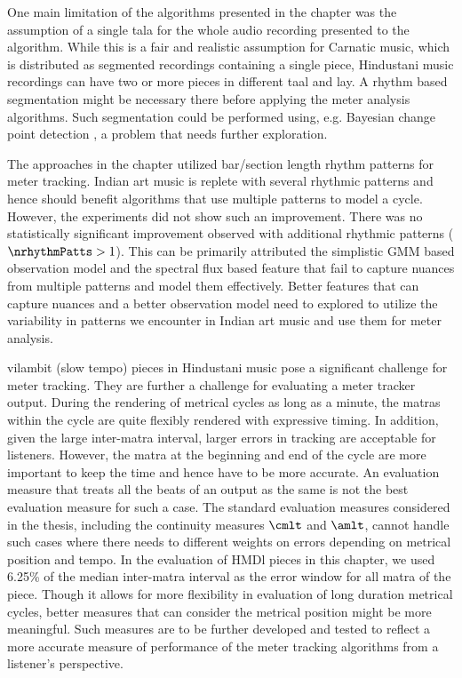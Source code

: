 One main limitation of the algorithms presented in the chapter was the assumption of a single \gls{tala} for the whole audio recording presented to the algorithm. While this is a fair and realistic assumption for Carnatic music, which is distributed as segmented recordings containing a single piece, Hindustani music recordings can have two or more pieces in different \gls{taal} and \gls{lay}. A rhythm based segmentation might be necessary there before applying the meter analysis algorithms. Such segmentation could be performed using, e.g. Bayesian change point detection \cite{barber:11:bayesian}, a problem that needs further exploration.

The approaches in the chapter utilized bar/section length rhythm patterns for meter tracking. Indian art music is replete with several rhythmic patterns and hence should benefit algorithms that use multiple patterns to model a cycle. However, the experiments did not show such an improvement. There was no statistically significant improvement observed with additional rhythmic patterns ($\nrhythmPatts > 1$). This can be primarily attributed the simplistic \gls{GMM} based observation model and the spectral flux based feature that fail to capture nuances from multiple patterns and model them effectively. Better features that can capture nuances and a better observation model need to explored to utilize the variability in patterns we encounter in Indian art music and use them for meter analysis. 

\Gls{vilambit} (slow tempo) pieces in Hindustani music pose a significant challenge for meter tracking. They are further a challenge for evaluating a meter tracker output. During the rendering of metrical cycles as long as a minute, the \glspl{matra} within the cycle are quite flexibly rendered with expressive timing. In addition, given the large inter-\gls{matra} interval, larger errors in tracking are acceptable for listeners. However, the \gls{matra} at the beginning and end of the cycle are more important to keep the time and hence have to be more accurate. An evaluation measure that treats all the beats of an output as the same is not the best evaluation measure for such a case. The standard evaluation measures considered in the thesis, including the continuity measures $\cmlt$ and $\amlt$, cannot handle such cases where there needs to different weights on errors depending on metrical position and tempo. In the evaluation of \acrshort{HMDl} pieces in this chapter, we used 6.25\% of the median inter-\gls{matra} interval as the error window for all \gls{matra} of the piece. Though it allows for more flexibility in evaluation of long duration metrical cycles, better measures that can consider the metrical position might be more meaningful. Such measures are to be further developed and tested to reflect a more accurate measure of performance of the meter tracking algorithms from a listener's perspective. 

